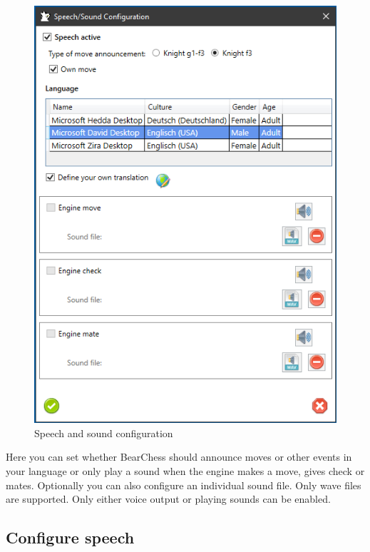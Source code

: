 \documentclass[11pt,a4paper]{article}
\begin{document}
\begin{figure}[H]
	\centering
	\includegraphics[scale=1.0]{Sounds1.png}
	\caption{Speech and sound configuration}
	\label{fig:Sounds1}
\end{figure}	

Here you can set whether BearChess should announce moves or other events in your language or only play a sound when the engine makes a move, gives check or mates. Optionally you can also configure an individual sound file. Only wave files are supported. Only either voice output or playing sounds can be enabled.

\subsection{Configure speech}
\end{document}
